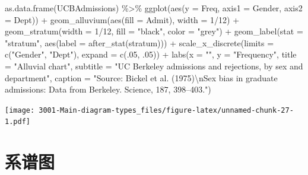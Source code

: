 \documentclass[
]{book}
\newenvironment{Shaded}{\begin{snugshade}}{\end{snugshade}}
\newcommand{\AttributeTok}[1]{\textcolor[rgb]{0.77,0.63,0.00}{#1}}
\newcommand{\DecValTok}[1]{\textcolor[rgb]{0.00,0.00,0.81}{#1}}
\newcommand{\FunctionTok}[1]{\textcolor[rgb]{0.00,0.00,0.00}{#1}}
\newcommand{\NormalTok}[1]{#1}
\newcommand{\SpecialCharTok}[1]{\textcolor[rgb]{0.00,0.00,0.00}{#1}}
\newcommand{\StringTok}[1]{\textcolor[rgb]{0.31,0.60,0.02}{#1}}
\begin{document}
\begin{Shaded}
\begin{Highlighting}[]
\FunctionTok{as.data.frame}\NormalTok{(UCBAdmissions) }\SpecialCharTok{\%\textgreater{}\%}
    \FunctionTok{ggplot}\NormalTok{(}\FunctionTok{aes}\NormalTok{(}\AttributeTok{y =}\NormalTok{ Freq, }\AttributeTok{axis1 =}\NormalTok{ Gender, }\AttributeTok{axis2 =}\NormalTok{ Dept)) }\SpecialCharTok{+}
    \FunctionTok{geom\_alluvium}\NormalTok{(}\FunctionTok{aes}\NormalTok{(}\AttributeTok{fill =}\NormalTok{ Admit), }\AttributeTok{width =} \DecValTok{1}\SpecialCharTok{/}\DecValTok{12}\NormalTok{) }\SpecialCharTok{+}
    \FunctionTok{geom\_stratum}\NormalTok{(}\AttributeTok{width =} \DecValTok{1}\SpecialCharTok{/}\DecValTok{12}\NormalTok{, }\AttributeTok{fill =} \StringTok{"black"}\NormalTok{, }\AttributeTok{color =} \StringTok{"grey"}\NormalTok{) }\SpecialCharTok{+}
    \FunctionTok{geom\_label}\NormalTok{(}\AttributeTok{stat =} \StringTok{"stratum"}\NormalTok{, }\FunctionTok{aes}\NormalTok{(}\AttributeTok{label =} \FunctionTok{after\_stat}\NormalTok{(stratum))) }\SpecialCharTok{+}
    \FunctionTok{scale\_x\_discrete}\NormalTok{(}\AttributeTok{limits =} \FunctionTok{c}\NormalTok{(}\StringTok{"Gender"}\NormalTok{, }\StringTok{"Dept"}\NormalTok{), }\AttributeTok{expand =} \FunctionTok{c}\NormalTok{(.}\DecValTok{05}\NormalTok{, .}\DecValTok{05}\NormalTok{)) }\SpecialCharTok{+}
      \FunctionTok{labs}\NormalTok{(}\AttributeTok{x =} \StringTok{""}\NormalTok{, }
           \AttributeTok{y =} \StringTok{"Frequency"}\NormalTok{,}
          \AttributeTok{title =} \StringTok{"Alluvial chart"}\NormalTok{, }
          \AttributeTok{subtitle =} \StringTok{"UC Berkeley admissions and rejections, by sex and department"}\NormalTok{,}
          \AttributeTok{caption =} \StringTok{"Source: Bickel et al. (1975)}\SpecialCharTok{\textbackslash{}n}\StringTok{Sex bias in graduate admissions: Data from Berkeley. Science, 187, 398–403."}\NormalTok{)}
\end{Highlighting}
\end{Shaded}

\texttt{[image: 3001-Main-diagram-types\_files/figure-latex/unnamed-chunk-27-1.pdf]}

\hypertarget{ux7cfbux8c31ux56fe}{%
\section{系谱图}\label{ux7cfbux8c31ux56fe}}
\end{document}
